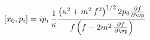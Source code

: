 \begin{equation}\label{a.6}
 [x_0, p_i] = i p_i\, \frac{1}{\kappa}\frac{\left(\kappa^{2}+m^2\, f^{2}\right)^{1/2}
 2p_{0}\frac{\partial f}{\partial \vp}}{f\left(f-2m^2\,
 \frac{\partial f}{\partial \vp}\right)}
\end{equation}

